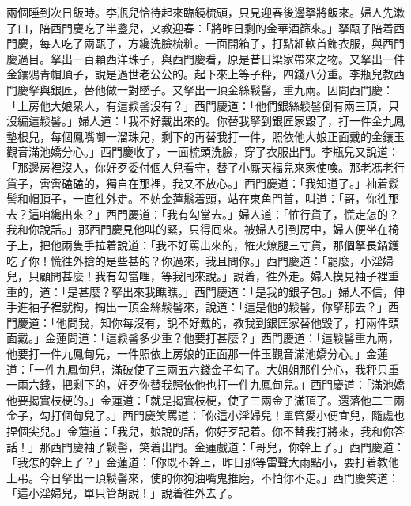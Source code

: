 兩個睡到次日飯時。李瓶兒恰待起來臨鏡梳頭，只見迎春後邊拏將飯來。婦人先漱了口，陪西門慶吃了半盞兒，又教迎春：「將昨日剩的金華酒篩來。」拏甌子陪着西門慶，每人吃了兩甌子，方纔洗臉梳粧。一面開箱子，打點細軟首飾衣服，與西門慶過目。拏出一百顆西洋珠子，{}與西門慶看，原是昔日梁家帶來之物。又拏出一件金鑲鴉青帽頂子，說是過世老公公的。起下來上等子秤，四錢八分重。李瓶兒教西門慶拏與銀匠，替他做一對墜子。又拏出一頂金絲鬏髻，重九兩。因問西門慶：「上房他大娘衆人，有這鬏髻沒有？」西門慶道：「他們銀絲鬏髻倒有兩三頂，只沒編這鬏髻。」{}婦人道：「我不好戴出來的。你替我拏到銀匠家毀了，打一件金九鳳墊根兒，每個鳳嘴啣一溜珠兒，剩下的再替我打一件，照依他大娘正面戴的金鑲玉觀音滿池嬌分心。」西門慶收了，一面梳頭洗臉，穿了衣服出門。李瓶兒又說道：「那邊房裡沒人，你好歹委付個人兒看守，替了小厮天福兒來家使喚。那老馮老行貨子，啻啻磕磕的，獨自在那裡，我又不放心。」西門慶道：「我知道了。」袖着鬏髻和帽頂子，一直徃外走。不妨金蓮鬅着頭，站在東角門首，{}叫道：「哥，你徃那去？這咱纔出來？」{}西門慶道：「我有勾當去。」婦人道：「恠行貨子，慌走怎的？我和你說話。」那西門慶見他叫的緊，只得囘來。被婦人引到房中，婦人便坐在椅子上，把他兩隻手拉着說道：「我不好罵出來的，恠火燎腿三寸貨，那個拏長鍋鑊吃了你！慌徃外搶的是些甚的？你過來，我且問你。」西門慶道：「罷麼，小淫婦兒，只顧問甚麼！我有勾當哩，等我囘來說。」說着，徃外走。婦人摸見袖子裡重重的，{}道：「是甚麼？拏出來我瞧瞧。」西門慶道：「是我的銀子包。」{}婦人不信，伸手進袖子裡就掏，掏出一頂金絲鬏髻來，說道：「這是他的鬏髻，{}你拏那去？」西門慶道：「他問我，知你每沒有，說不好戴的，教我到銀匠家替他毀了，打兩件頭面戴。」金蓮問道：「這鬏髻多少重？他要打甚麼？」西門慶道：「這鬏髻重九兩，他要打一件九鳳甸兒，一件照依上房娘的正面那一件玉觀音滿池嬌分心。」金蓮道：「一件九鳳甸兒，滿破使了三兩五六錢金子勾了。{}大姐姐那件分心，我秤只重一兩六錢，{}把剩下的，好歹你替我照依他也打一件九鳳甸兒。」西門慶道：「滿池嬌他要揭實枝梗的。」金蓮道：「就是揭實枝梗，使了三兩金子滿頂了。還落他二三兩金子，{}勾打個甸兒了。」西門慶笑罵道：「你這小淫婦兒！單管愛小便宜兒，隨處也捏個尖兒。」金蓮道：「我兒，娘說的話，你好歹記着。你不替我打將來，我和你答話！」那西門慶袖了鬏髻，笑着出門。金蓮戲道：「哥兒，你幹上了。」西門慶道：「我怎的幹上了？」金蓮道：「你既不幹上，昨日那等雷聲大雨點小，要打着教他上弔。今日拏出一頂鬏髻來，使的你狗油嘴鬼推磨，不怕你不走。」{}西門慶笑道：「這小淫婦兒，單只管胡說！」說着徃外去了。

